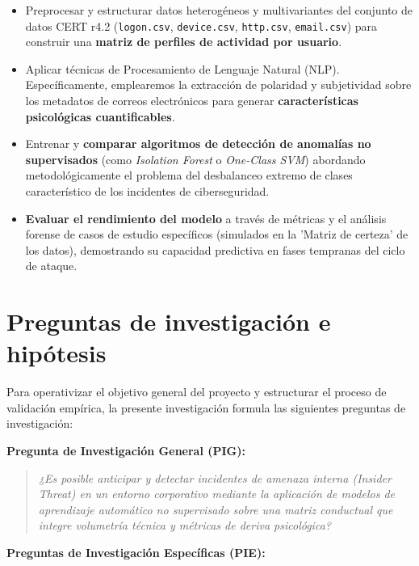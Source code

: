 \documentclass[IB]{TFUOC}%
\begin{document}
\begin{itemize}
    \item Preprocesar y estructurar datos heterogéneos y multivariantes del conjunto de datos CERT r4.2 (\texttt{logon.csv}, \texttt{device.csv}, \texttt{http.csv}, \texttt{email.csv}) para construir una \textbf{matriz de perfiles de actividad por usuario}.
    \item Aplicar técnicas de Procesamiento de Lenguaje Natural (NLP). Específicamente, emplearemos la extracción de polaridad y subjetividad sobre los metadatos de correos electrónicos para generar \textbf{características psicológicas cuantificables}.
    \item Entrenar y \textbf{comparar algoritmos de detección de anomalías no supervisados} (como \textit{Isolation Forest} o \textit{One-Class SVM}) abordando metodológicamente el problema del desbalanceo extremo de clases característico de los incidentes de ciberseguridad.
    \item \textbf{Evaluar el rendimiento del modelo} a través de métricas y el análisis forense de casos de estudio específicos (simulados en la 'Matriz de certeza' de los datos), demostrando su capacidad predictiva en fases tempranas del ciclo de ataque.
\end{itemize}

\section{Preguntas de investigación e hipótesis}

Para operativizar el objetivo general del proyecto y estructurar el proceso de validación empírica, la presente investigación formula las siguientes preguntas de investigación:

\medskip
\noindent\textbf{Pregunta de Investigación General (PIG):}

\begin{quote}
\textit{¿Es posible anticipar y detectar incidentes de amenaza interna (\textit{Insider Threat}) en un entorno corporativo mediante la aplicación de modelos de aprendizaje automático no supervisado sobre una matriz conductual que integre volumetría técnica y métricas de deriva psicológica?}
\end{quote}

\noindent\textbf{Preguntas de Investigación Específicas (PIE):}
\end{document}
